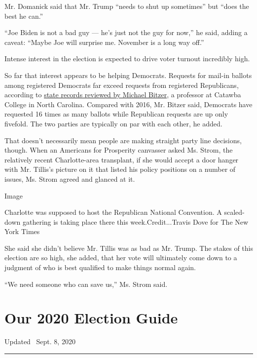 Mr. Domanick said that Mr. Trump ``needs to shut up sometimes'' but
``does the best he can.''

``Joe Biden is not a bad guy --- he's just not the guy for now,'' he
said, adding a caveat: ``Maybe Joe will surprise me. November is a long
way off.''

Intense interest in the election is expected to drive voter turnout
incredibly high.

So far that interest appears to be helping Democrats. Requests for
mail-in ballots among registered Democrats far exceed requests from
registered Republicans, according to
\href{http://www.oldnorthstatepolitics.com/2020/08/NC-ABM-ballot-requests-Aug-10.html\#more}{state
records reviewed by Michael Bitzer}, a professor at Catawba College in
North Carolina. Compared with 2016, Mr. Bitzer said, Democrats have
requested 16 times as many ballots while Republican requests are up only
fivefold. The two parties are typically on par with each other, he
added.

That doesn't necessarily mean people are making straight party line
decisions, though. When an Americans for Prosperity canvasser asked Ms.
Strom, the relatively recent Charlotte-area transplant, if she would
accept a door hanger with Mr. Tillis's picture on it that listed his
policy positions on a number of issues, Ms. Strom agreed and glanced at
it.

Image

Charlotte was supposed to host the Republican National Convention. A
scaled-down gathering is taking place there this week.Credit...Travis
Dove for The New York Times

She said she didn't believe Mr. Tillis was as bad as Mr. Trump. The
stakes of this election are so high, she added, that her vote will
ultimately come down to a judgment of who is best qualified to make
things normal again.

``We need someone who can save us,'' Ms. Strom said.

\hypertarget{our-2020-election-guide}{%
\section{Our 2020 Election Guide}\label{our-2020-election-guide}}

Updated ~Sept. 8, 2020

\begin{center}\rule{0.5\linewidth}{\linethickness}\end{center}

